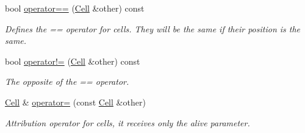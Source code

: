 \begin{DoxyCompactItemize}
bool \hyperlink{structCell_a3135350198f9e8029260b2468810db9a}{operator==} (\hyperlink{structCell}{Cell} \&other) const
\begin{DoxyCompactList}\small\item\em Defines the == operator for cells. They will be the same if their position is the same. \end{DoxyCompactList}\item 
\mbox{\label{structCell_a04f6b5ed3c6d41183d97dd029de55f2e}} 
bool \hyperlink{structCell_a04f6b5ed3c6d41183d97dd029de55f2e}{operator!=} (\hyperlink{structCell}{Cell} \&other) const
\begin{DoxyCompactList}\small\item\em The opposite of the == operator. \end{DoxyCompactList}\item 
\mbox{\label{structCell_a9b404d980a2bc24378a55841c9192311}} 
\hyperlink{structCell}{Cell} \& \hyperlink{structCell_a9b404d980a2bc24378a55841c9192311}{operator=} (const \hyperlink{structCell}{Cell} \&other)
\begin{DoxyCompactList}\small\item\em Attribution operator for cells, it receives only the alive parameter. \end{DoxyCompactList}\end{DoxyCompactItemize}
